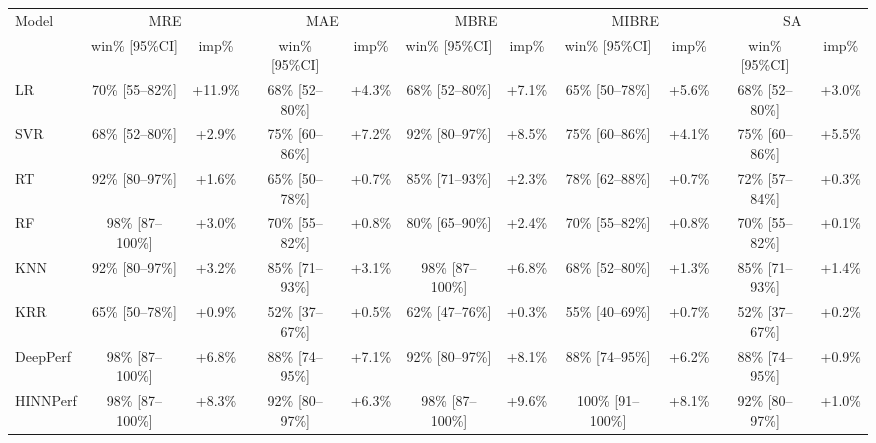 \begin{tabular}{lcccccccccc}
\toprule
Model & \multicolumn{2}{c}{MRE} & \multicolumn{2}{c}{MAE} & \multicolumn{2}{c}{MBRE} & \multicolumn{2}{c}{MIBRE} & \multicolumn{2}{c}{SA} \\
& win\% [95\%CI] & imp\% & win\% [95\%CI] & imp\% & win\% [95\%CI] & imp\% & win\% [95\%CI] & imp\% & win\% [95\%CI] & imp\% \\
\midrule
LR & 70\% [55--82\%] & +11.9\% & 68\% [52--80\%] & +4.3\% & 68\% [52--80\%] & +7.1\% & 65\% [50--78\%] & +5.6\% & 68\% [52--80\%] & +3.0\% \\
SVR & 68\% [52--80\%] & +2.9\% & 75\% [60--86\%] & +7.2\% & 92\% [80--97\%] & +8.5\% & 75\% [60--86\%] & +4.1\% & 75\% [60--86\%] & +5.5\% \\
RT & 92\% [80--97\%] & +1.6\% & 65\% [50--78\%] & +0.7\% & 85\% [71--93\%] & +2.3\% & 78\% [62--88\%] & +0.7\% & 72\% [57--84\%] & +0.3\% \\
RF & 98\% [87--100\%] & +3.0\% & 70\% [55--82\%] & +0.8\% & 80\% [65--90\%] & +2.4\% & 70\% [55--82\%] & +0.8\% & 70\% [55--82\%] & +0.1\% \\
KNN & 92\% [80--97\%] & +3.2\% & 85\% [71--93\%] & +3.1\% & 98\% [87--100\%] & +6.8\% & 68\% [52--80\%] & +1.3\% & 85\% [71--93\%] & +1.4\% \\
KRR & 65\% [50--78\%] & +0.9\% & 52\% [37--67\%] & +0.5\% & 62\% [47--76\%] & +0.3\% & 55\% [40--69\%] & +0.7\% & 52\% [37--67\%] & +0.2\% \\
DeepPerf & 98\% [87--100\%] & +6.8\% & 88\% [74--95\%] & +7.1\% & 92\% [80--97\%] & +8.1\% & 88\% [74--95\%] & +6.2\% & 88\% [74--95\%] & +0.9\% \\
HINNPerf & 98\% [87--100\%] & +8.3\% & 92\% [80--97\%] & +6.3\% & 98\% [87--100\%] & +9.6\% & 100\% [91--100\%] & +8.1\% & 92\% [80--97\%] & +1.0\% \\
\bottomrule
\end{tabular}
